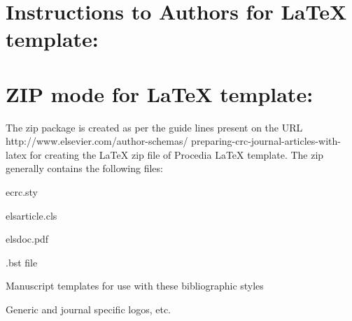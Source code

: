 \documentclass[5p,times,procedia]{elsarticle}
\begin{document}










\clearpage\onecolumn

\normalMode

\section*{Instructions to Authors for LaTeX template:}

\section{ZIP mode for LaTeX template:}

The zip package is created as per the guide lines present on the URL http://www.elsevier.com/author-schemas/ preparing-crc-journal-articles-with-latex for creating the LaTeX zip file of Procedia LaTeX template.  The zip generally contains the following files:
\begin{Itemize}[]\leftskip-12.7pt
\item ecrc.sty
\item  elsarticle.cls
\item elsdoc.pdf
\item .bst file
\item Manuscript templates for use with these bibliographic styles
\item  Generic and journal specific logos, etc.
\end{Itemize}
\end{document}
